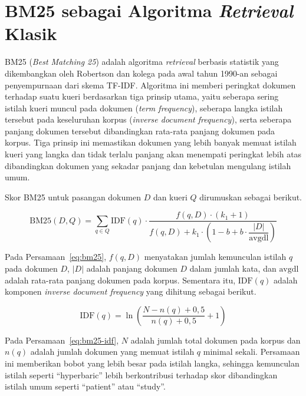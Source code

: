 
\section{BM25 sebagai Algoritma \textit{Retrieval} Klasik}
\label{sec:bm25-teori}

BM25 (\textit{Best Matching 25}) adalah algoritma \textit{retrieval} berbasis statistik yang dikembangkan oleh Robertson dan kolega pada awal tahun 1990-an sebagai penyempurnaan dari skema TF-IDF. Algoritma ini memberi peringkat dokumen terhadap suatu kueri berdasarkan tiga prinsip utama, yaitu seberapa sering istilah kueri muncul pada dokumen (\textit{term frequency}), seberapa langka istilah tersebut pada keseluruhan korpus (\textit{inverse document frequency}), serta seberapa panjang dokumen tersebut dibandingkan rata-rata panjang dokumen pada korpus. Tiga prinsip ini memastikan dokumen yang lebih banyak memuat istilah kueri yang langka dan tidak terlalu panjang akan menempati peringkat lebih atas dibandingkan dokumen yang sekadar panjang dan kebetulan mengulang istilah umum.

Skor BM25 untuk pasangan dokumen $D$ dan kueri $Q$ dirumuskan sebagai berikut.

\begin{equation}
\label{eq:bm25}
\text{BM25}(D, Q) = \sum_{q \in Q} \text{IDF}(q) \cdot \frac{f(q, D) \cdot (k_1 + 1)}{f(q, D) + k_1 \cdot \left(1 - b + b \cdot \dfrac{|D|}{\text{avgdl}}\right)}
\end{equation}

Pada Persamaan~\ref{eq:bm25}, $f(q, D)$ menyatakan jumlah kemunculan istilah $q$ pada dokumen $D$, $|D|$ adalah panjang dokumen $D$ dalam jumlah kata, dan $\text{avgdl}$ adalah rata-rata panjang dokumen pada korpus. Sementara itu, $\text{IDF}(q)$ adalah komponen \textit{inverse document frequency} yang dihitung sebagai berikut.

\begin{equation}
\label{eq:bm25-idf}
\text{IDF}(q) = \ln \left( \dfrac{N - n(q) + 0{,}5}{n(q) + 0{,}5} + 1 \right)
\end{equation}

Pada Persamaan~\ref{eq:bm25-idf}, $N$ adalah jumlah total dokumen pada korpus dan $n(q)$ adalah jumlah dokumen yang memuat istilah $q$ minimal sekali. Persamaan ini memberikan bobot yang lebih besar pada istilah langka, sehingga kemunculan istilah seperti ``hyperbaric'' lebih berkontribusi terhadap skor dibandingkan istilah umum seperti ``patient'' atau ``study''.

